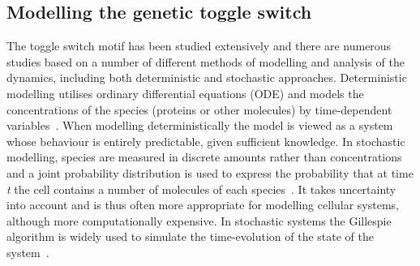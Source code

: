 \subsection{Modelling the genetic toggle switch} 
The toggle switch motif has been studied extensively and there are numerous studies based on a number of different methods of modelling and analysis of the dynamics, including both deterministic and stochastic approaches. Deterministic modelling utilises ordinary differential equations (ODE) and models the concentrations of the species (proteins or other molecules) by time-dependent variables~\autocite{deJong:2002ft}. When modelling deterministically the model is viewed as a system whose behaviour is entirely predictable, given sufficient knowledge. In stochastic modelling, species are measured in discrete amounts rather than concentrations and a joint probability distribution is used to express the probability that at time \textit{t} the cell contains a number of molecules of each species~\autocite{deJong:2002ft,Wilkinson:2006}. It takes uncertainty into account and is thus often more appropriate for modelling cellular systems, although more computationally expensive. In stochastic systems the Gillespie algorithm is widely used to simulate the time-evolution of the state of the system~\autocite{Warren:2005kea}.
\par

